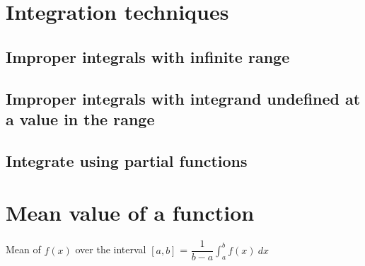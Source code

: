 \section{Integration techniques}
\subsection{Improper integrals with infinite range}
\subsection{Improper integrals with integrand undefined at a value in the range}
\subsection{Integrate using partial functions}
\section{Mean value of a function}
Mean of $f(x)$ over the interval $[a,b]$ = $\dfrac{1}{b-a}\int_{a}^{b} f(x) \: dx$